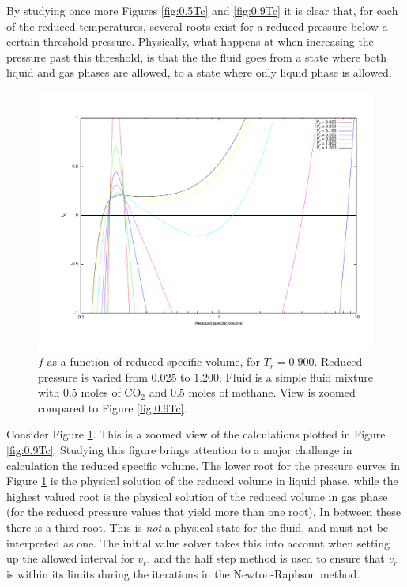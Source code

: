 \documentclass[internal,english]{sintefmemo2012}
\numberwithin{equation}{section}
\begin{document}
By studying once more Figures \ref{fig:0.5Tc} and \ref{fig:0.9Tc} it is clear that, for each of the reduced temperatures, several roots exist for a reduced pressure below a certain threshold pressure. Physically, what happens at when increasing the pressure past this threshold, is that the the fluid goes from a state where both liquid and gas phases are allowed, to a state where only liquid phase is allowed.

\begin{figure}
	\centering
	\includegraphics[trim = 1.5cm 2cm 0 1cm, clip = true, width=14cm]{09TcZoom}
	\caption{$f$ as a function of reduced specific volume, for $T_r = 0.900$. Reduced pressure is varied from 0.025 to 1.200. Fluid is a simple fluid mixture with 0.5 moles of CO$_2$ and 0.5 moles of methane. View is zoomed compared to Figure \ref{fig:0.9Tc}.}
	\label{fig:0.9TcZoom}
\end{figure}

Consider Figure \ref{fig:0.9TcZoom}. This is a zoomed view of the calculations plotted in Figure \ref{fig:0.9Tc}. Studying this figure brings attention to a major challenge in calculation the reduced specific volume. The lower root for the pressure curves in Figure \ref{fig:0.9TcZoom} is the physical solution of the reduced volume in liquid phase, while the highest valued root is the physical solution of the reduced volume in gas phase (for the reduced pressure values that yield more than one root). In between these there is a third root. This is \textit{not} a physical state for the fluid, and must not be interpreted as one. The initial value solver takes this into account when setting up the allowed interval for $v_r$, and the half step method is used to ensure that $v_r$ is within its limits during the iterations in the Newton-Raphson method.
\end{document}
